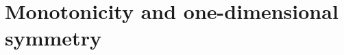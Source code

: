 \documentclass[reqno]{amsart}
\theoremstyle{plain}
\newtheorem{lemma}[theorem]{Lemma}
\theoremstyle{definition}
\theoremstyle{remark}
\begin{document}
	\section{Monotonicity and one-dimensional symmetry}\label{sect5}
	
\end{document}

